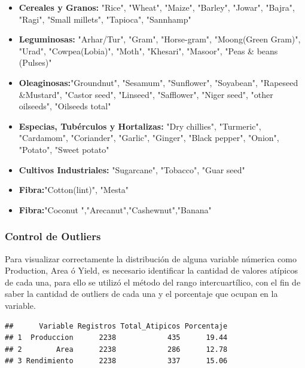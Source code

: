 \documentclass[oneside,11pt]{Latex/Classes/PhDthesisPSnPDF}
\begin{document}
\begin{itemize}
 \item{\textbf{Cereales y Granos:} "Rice", "Wheat", "Maize", "Barley", "Jowar", "Bajra", "Ragi", "Small millets", "Tapioca", "Sannhamp"}
 
 \item{\textbf{Leguminosas:} "Arhar/Tur", "Gram", "Horse-gram", "Moong(Green Gram)", "Urad", "Cowpea(Lobia)", "Moth", "Khesari", "Masoor", "Peas & beans (Pulses)"}
 
 \item{\textbf{Oleaginosas:}"Groundnut", "Sesamum", "Sunflower", "Soyabean", "Rapeseed &Mustard", "Castor seed", "Linseed", "Safflower", "Niger seed", "other oilseeds", "Oilseeds total"}
 
 \item{\textbf{Especias, Tubérculos y Hortalizas:} "Dry chillies", "Turmeric", "Cardamom", "Coriander", "Garlic", "Ginger", "Black pepper", "Onion", "Potato", "Sweet potato"}
 
 \item{\textbf{Cultivos Industriales:} "Sugarcane", "Tobacco", "Guar seed"}
 
 \item{\textbf{Fibra:}"Cotton(lint)", "Mesta"}
 
  \item{\textbf{Fibra:}"Coconut ","Arecanut","Cashewnut","Banana"}
 
\end{itemize}

\hfill\break

\subsubsection{Control de Outliers}

Para visualizar correctamente la distribución de alguna variable
númerica como Production, Area ó Yield, es necesario identificar la
cantidad de valores atípicos de cada una, para ello se utilizó el método
del rango intercuartílico, con el fin de saber la cantidad de outliers
de cada una y el porcentaje que ocupan en la variable.\\

\begin{verbatim}
##      Variable Registros Total_Atipicos Porcentaje
## 1  Produccion      2238            435      19.44
## 2        Area      2238            286      12.78
## 3 Rendimiento      2238            337      15.06
\end{verbatim}
\end{document}
